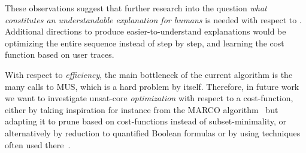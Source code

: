 These observations suggest that further research into the question \emph{what constitutes an understandable explanation for humans} is needed with respect to . Additional directions to produce easier-to-understand explanations would be optimizing the entire sequence instead of step by step, and learning the cost function based on user traces. 


With respect to \emph{efficiency}, the main bottleneck of the current algorithm is the many calls to MUS, which is a hard problem by itself. 
Therefore, in future work we want to investigate unsat-core \emph{optimization} with respect to a cost-function, either by taking inspiration for instance from the MARCO algorithm~\cite{liffiton2013enumerating} but adapting it to prune based on cost-functions instead of subset-minimality, or alternatively by reduction to quantified Boolean formulas or by using techniques often used there~\cite{QBF,DBLP:journals/constraints/IgnatievJM16}.


